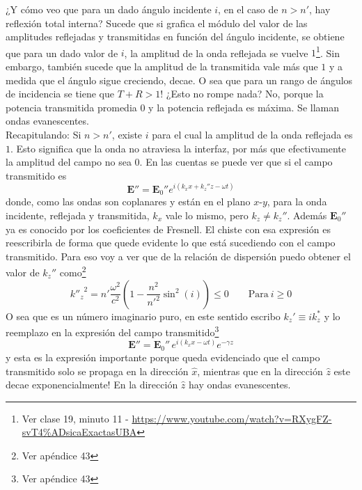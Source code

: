 \indent ¿Y cómo veo que para un dado ángulo incidente $i$, en el caso de $n > n'$, hay reflexión total interna? Sucede que si grafica el módulo del valor de las amplitudes reflejadas y transmitidas en función del ángulo incidente, se obtiene que para un dado valor de $i$, la amplitud de la onda reflejada se vuelve $1$\footnote{Ver clase 19, minuto 11 - \url{https://www.youtube.com/watch?v=RXygFZ-svT4\%ADsicaExactasUBA}}. Sin embargo, también sucede que la amplitud de la transmitida vale más que $1$ y a medida que el ángulo sigue creciendo, decae. O sea que para un rango de ángulos de incidencia se tiene que $T + R > 1$! ¿Esto no rompe nada? No, porque la potencia transmitida promedia 0 y la potencia reflejada es máxima. Se llaman ondas evanescentes.\\
\indent Recapitulando: Si $n > n'$, existe $i$ para el cual la amplitud de la onda reflejada es $1$. Esto significa que la onda no atraviesa la interfaz, por más que efectivamente la amplitud del campo no sea $0$. En las cuentas se puede ver que si el campo transmitido es
\begin{equation*}
    \textbf{E}'' = \textbf{E}_{0}''e^{i(k_{x}x + k_{z}''z - \omega t)}
\end{equation*}
donde, como las ondas son coplanares y están en el plano $x$-$y$, para la onda incidente, reflejada y transmitida, $k_{x}$ vale lo mismo, pero $k_{z} \neq k_{z}''$. Además $\textbf{E}_{0}''$ ya es conocido por los coeficientes de Fresnell. El chiste con esa expresión es reescribirla de forma que quede evidente lo que está sucediendo con el campo transmitido. Para eso voy a ver que de la relación de dispersión puedo obtener el valor de $k_{z}''$ como\footnote{Ver apéndice 43}
\begin{equation*}
    {k''_{z}}^{2} = n'\frac{\omega^{2}}{c^{2}}
    \left(
        1 - \frac{n^{2}}{n'^{2}}\sin^{2}{(i)} 
    \right)
    \leq 0
    \quad
    \quad
    \mbox{Para}\ i \geq 0
\end{equation*}
O sea que es un número imaginario puro, en este sentido escribo $k_{z}' \equiv ik_{z}^{*}$ y lo reemplazo en la expresión del campo transmitido\footnote{Ver apéndice 43}
\begin{equation*}
    \textbf{E}'' = \textbf{E}_{0}''\,e^{i(k_{x}x - \omega t)}e^{-\gamma z}
\end{equation*}
y esta es la expresión importante porque queda evidenciado que el campo transmitido solo se propaga en la dirección $\hat{x}$, mientras que en la dirección $\hat{z}$ este decae exponencialmente! En la dirección $\hat{z}$ hay ondas evanescentes.\\

